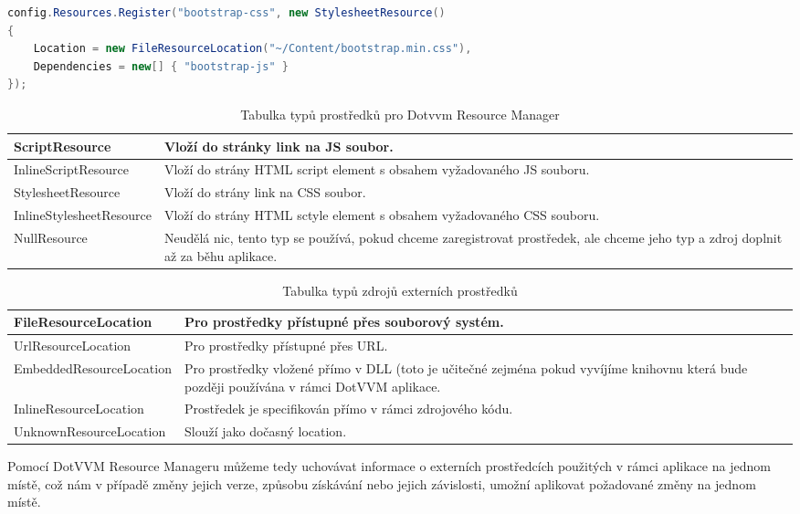 \begin{lstlisting}[language=c#, caption=Registrace CSS,label=resourceAdd,captionpos=t]
config.Resources.Register("bootstrap-css", new StylesheetResource()
{
    Location = new FileResourceLocation("~/Content/bootstrap.min.css"),
    Dependencies = new[] { "bootstrap-js" }
});
\end{lstlisting}

\begin{table}[H]
	\caption{Tabulka typů prostředků pro Dotvvm Resource Manager}
	\label{resTypeTable}
	\centering
	\begin{tabular}{m{12em}|m{22em}}
		\toprule
ScriptResource           & Vloží do stránky link na JS soubor. \\ \midrule
InlineScriptResource     & Vloží do strány HTML script element s obsahem vyžadovaného JS souboru. \\ \midrule
StylesheetResource       & Vloží do strány link na CSS soubor. \\ \midrule
InlineStylesheetResource & Vloží do strány HTML sctyle element s obsahem vyžadovaného CSS souboru. \\ \midrule
NullResource             & Neudělá nic, tento typ se používá, pokud chceme zaregistrovat prostředek, ale chceme jeho typ a zdroj doplnit až za běhu aplikace. \\
\bottomrule
\end{tabular}
\end{table}

\begin{table}[H]
	\caption{Tabulka typů zdrojů externích prostředků}
	\label{resLocTable}
	\centering
	\begin{tabular}{m{12em}|m{22em}}
		\toprule
FileResourceLocation           & Pro prostředky přístupné přes souborový systém. \\ \midrule
UrlResourceLocation           & Pro prostředky přístupné přes URL.\\ \midrule
EmbeddedResourceLocation           & Pro prostředky vložené přímo v DLL (toto je učitečné zejména pokud vyvíjíme knihovnu která bude později používána v rámci DotVVM aplikace. \\ \midrule
InlineResourceLocation           & Prostředek je specifikován přímo v rámci zdrojového kódu. \\ \midrule
UnknownResourceLocation           & Slouží jako dočasný location. \\
\bottomrule
\end{tabular}
\end{table}
Pomocí DotVVM Resource Manageru můžeme tedy uchovávat informace o externích prostředcích použitých v rámci aplikace na jednom místě, což nám v případě změny jejich verze, způsobu získávání nebo jejich závislosti, umožní aplikovat požadované změny na jednom místě.

